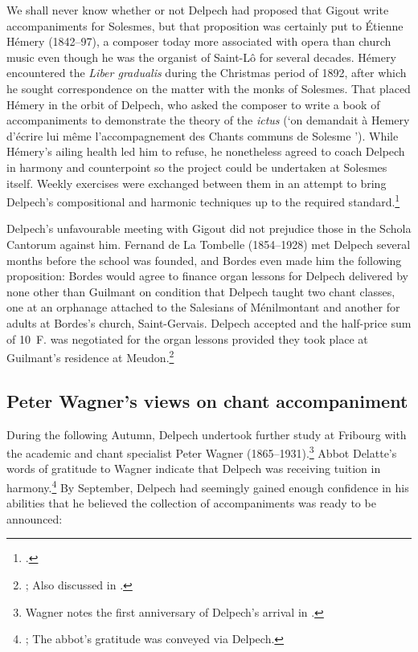 We shall never know whether or not Delpech had proposed that Gigout write accompaniments for Solesmes, but that proposition was certainly put to Étienne Hémery (1842--97), a composer today more associated with opera than church music even though he was the organist of Saint-Lô for several decades.
Hémery encountered the \emph{Liber gradualis} during the Christmas period of 1892, after which he sought correspondence on the matter with the monks of Solesmes.
That placed Hémery in the orbit of Delpech, who asked the composer to write a book of accompaniments to demonstrate the theory of the \emph{ictus} (`on demandait à Hemery d'écrire lui même l'accompagnement des Chants communs de Solesme \sic{}').
While Hémery's ailing health led him to refuse, he nonetheless agreed to coach Delpech in harmony and counterpoint so the project could be undertaken at Solesmes itself.
Weekly exercises were exchanged between them in an attempt to bring Delpech's compositional and harmonic techniques up to the required standard.\footcite[231--4]{HemeryEtienneHemerySa1898}

Delpech's unfavourable meeting with Gigout did not prejudice those in the Schola Cantorum against him.
Fernand de La Tombelle (1854--1928) met Delpech several months before the school was founded, and Bordes even made him the following proposition: Bordes would agree to finance organ lessons for Delpech delivered by none other than Guilmant on condition that Delpech taught two chant classes, one at an orphanage attached to the Salesians of Ménilmontant and another for adults at Bordes's church, Saint-Gervais.
Delpech accepted and the half-price sum of 10~F. was negotiated for the organ lessons provided they took place at Guilmant's residence at Meudon.\footnote{; Also discussed in \cite[120]{HalaSolesmesmusiciensSchola2017}.}
\noclub[2]

\subsection{Peter Wagner's views on chant accompaniment}
During the following Autumn, Delpech undertook further study at Fribourg with the academic and chant specialist Peter Wagner (1865--1931).\footnote{Wagner notes the first anniversary of Delpech's arrival in .}
Abbot Delatte's words of gratitude to Wagner indicate that Delpech was receiving tuition in harmony.\footnote{; The abbot's gratitude was conveyed via Delpech.}
By September, Delpech had seemingly gained enough confidence in his abilities that he believed the \mbox{collection} of accompaniments was ready to be announced:

